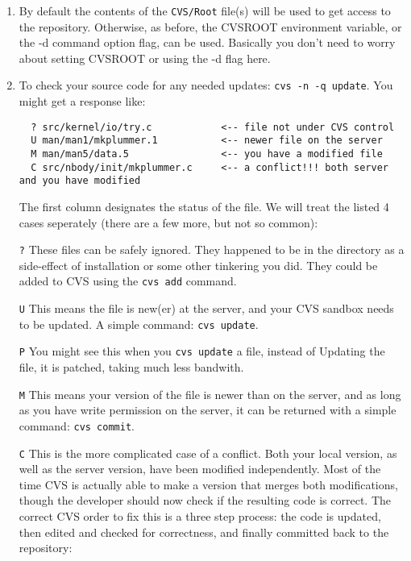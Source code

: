 \begin{itemize}
\begin{itemize}
\begin{enumerate}

\item By default the contents of the {\tt CVS/Root} file(s) will be used to
get access to the repository. Otherwise, as before, the CVSROOT environment
variable, or the -d command option flag, can be used. Basically you
don't need to worry about setting CVSROOT or using the -d flag here.

\item To check your source code for any needed updates: {\tt cvs -n -q update}.
You might get a response like:
\footnotesize\begin{verbatim}
  ? src/kernel/io/try.c            <-- file not under CVS control
  U man/man1/mkplummer.1           <-- newer file on the server
  M man/man5/data.5                <-- you have a modified file
  C src/nbody/init/mkplummer.c     <-- a conflict!!! both server and you have modified
\end{verbatim}\normalsize
The first column designates the status of the file. 
We will treat the listed 4 cases seperately (there are a few more, but not
so common):

\item[{\tt ?}] 
These files can be safely ignored. They happened to be in the directory
as a side-effect of installation or some other tinkering you did. They could
be added to CVS using the {\tt cvs add} command.

\item[{\tt U}] 
This means the file is new(er) at the server, and your
CVS sandbox needs to be updated. A simple command: {\tt cvs update}.

\item[{\tt P}] You might see this when you {\tt cvs update} a file, instead
of Updating the file, it is patched, taking much less bandwith.

\item[{\tt M}] This means your version of the file is newer than on
the server, 
and as long as you have write permission on the server, it can be returned
with a simple command: {\tt cvs commit}.

\item[{\tt C}] This is the more complicated case of a conflict. Both your local
version, as well as the server version, have been modified independently.
Most of the time CVS is actually able to make a version that merges both
modifications, though the developer should now check if the resulting code
is correct. The correct CVS order to fix this is a three step process: the
code is updated, then edited and checked for correctness, and finally
committed back to the repository:


\end{enumerate}
\end{itemize}
\end{itemize}
